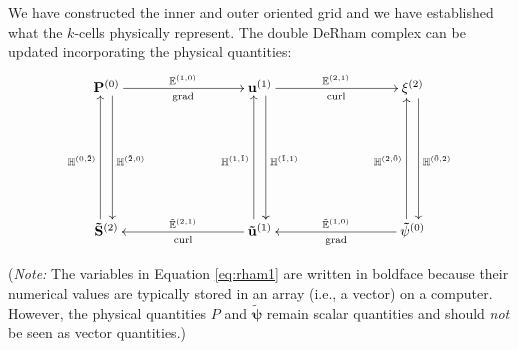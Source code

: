 We have constructed the inner and outer oriented grid and we have established what the $k$-cells physically represent. The double DeRham complex can be updated incorporating the physical quantities:
\begin{equation}
    \label{eq:rham1}
    \begin{gathered}
        \xymatrix@=20ex{
            \mathbf{P}^{(0)} \ar[r]^{\mathbb{E}^{(1,0)}}_{\text{grad}} \ar@<1ex>[d]^{\mathbb{H}^{(\tilde{2},0)}} & \mathbf{u}^{(1)} \ar[r]^{\mathbb{E}^{(2,1)}}_{\text{curl}} \ar@<1ex>[d]^{\mathbb{H}^{(\tilde{1},1)}} & \mathbf{\xi}^{(2)} \ar@<1ex>[d]^{\mathbb{H}^{(\tilde{0},2)}} \\
            \mathbf{\tilde{S}}^{(2)} \ar@<1ex>[u]^{\mathbb{H}^{(0,\tilde{2})}} & \mathbf{\tilde{u}}^{(1)} \ar[l]_{\tilde{\mathbb{E}}^{(2, 1)}}^{\text{curl}} \ar@<1ex>[u]^{\mathbb{H}^{(1,\tilde{1})}} & \mathbf{\tilde{\psi}}^{(0)} \ar[l]_{\tilde{\mathbb{E}}^{(1,0)}}^{\text{grad}} \ar@<1ex>[u]^{\mathbb{H}^{(2,\tilde{0})}}
        }
    \end{gathered}
\end{equation}

(\textit{Note:} The variables in Equation \eqref{eq:rham1} are written in boldface because their numerical values are typically stored in an array (i.e., a vector) on a computer. However, the physical quantities $P$ and $\mathbf{\tilde{\psi}}$ remain scalar quantities and should \emph{not} be seen as vector quantities.)
